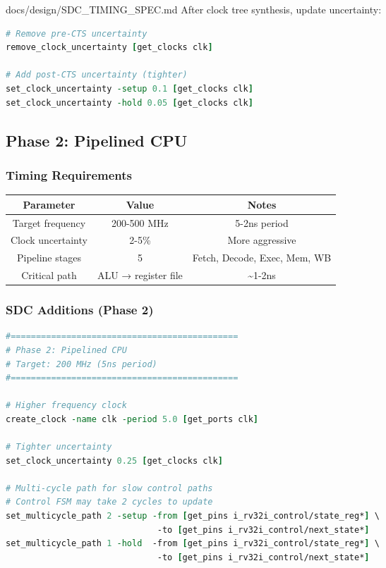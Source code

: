 \begin{relocated}{docs/design/SDC_TIMING_SPEC.md}
After clock tree synthesis, update uncertainty:

\begin{lstlisting}[language=tcl]
# Remove pre-CTS uncertainty
remove_clock_uncertainty [get_clocks clk]

# Add post-CTS uncertainty (tighter)
set_clock_uncertainty -setup 0.1 [get_clocks clk]
set_clock_uncertainty -hold 0.05 [get_clocks clk]
\end{lstlisting}

\subsection{Phase 2: Pipelined CPU}\label{ds:ch:sdc-timing-spec:phase-2-pipelined-cpu}

\subsubsection{Timing Requirements}\label{ds:ch:sdc-timing-spec:timing-requirements-1}

{
\begin{longtable}[]{@{}ccc@{}}
\toprule\noalign{}
Parameter & Value & Notes \\
\midrule\noalign{}
\endhead
\bottomrule\noalign{}
\endlastfoot
Target frequency & 200-500 MHz & 5-2ns period \\
Clock uncertainty & 2-5\% & More aggressive \\
Pipeline stages & 5 & Fetch, Decode, Exec, Mem, WB \\
Critical path & ALU → register file & \textasciitilde1-2ns \\
\end{longtable}
}

\subsubsection{SDC Additions (Phase 2)}\label{ds:ch:sdc-timing-spec:sdc-additions-phase-2}

\begin{lstlisting}[language=tcl]
#=============================================
# Phase 2: Pipelined CPU
# Target: 200 MHz (5ns period)
#=============================================

# Higher frequency clock
create_clock -name clk -period 5.0 [get_ports clk]

# Tighter uncertainty
set_clock_uncertainty 0.25 [get_clocks clk]

# Multi-cycle path for slow control paths
# Control FSM may take 2 cycles to update
set_multicycle_path 2 -setup -from [get_pins i_rv32i_control/state_reg*] \
                              -to [get_pins i_rv32i_control/next_state*]
set_multicycle_path 1 -hold  -from [get_pins i_rv32i_control/state_reg*] \
                              -to [get_pins i_rv32i_control/next_state*]


\end{lstlisting}
\end{relocated}
